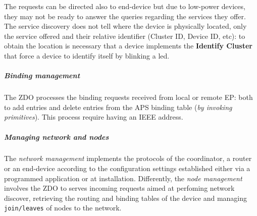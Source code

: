 \documentclass[10pt,a4paper]{report}
\theoremstyle{definition}
\begin{document}
The requests can be directed also to end-device but due to low-power devices, they may not be ready to answer the queries regarding the services they offer.
The service discovery does not tell where the device is physically located, only the service offered and their relative identifier (Cluster ID, Device ID, etc): to obtain the location is necessary that a device implements the \textbf{Identify Cluster} that force a device to identify itself by blinking a led.
\subparagraph{Binding management}\label{sec:binding-management}
The ZDO processes the binding requests received from local or remote EP: both to add entries and delete entries from the APS binding table (\textit{by invoking primitives}). This process require having an IEEE address.
\subparagraph{Managing network and nodes}\label{sec:managing-network-and-nodes}
The \textit{network management} implements the protocols of the coordinator, a router or an end-device according to the configuration settings established either via a programmed application or at installation. Differently, the \textit{node management} involves the ZDO to serves incoming requests aimed at perfoming network discover, retrieving the routing and binding tables of the device and managing \texttt{join/leaves} of nodes to the network.
\end{document}
